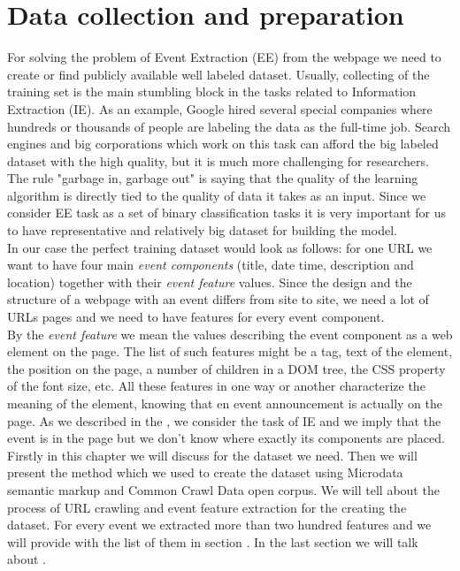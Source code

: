 \chapter{Data collection and preparation}
\label{chap:datacollect}

For solving the problem of Event Extraction (EE) from the webpage we need to create or find publicly available well labeled dataset. Usually, collecting of the training set is the main stumbling block in the tasks related to Information Extraction (IE). As an example, Google hired several special companies where hundreds or thousands of people are labeling the data as the full-time job. Search engines and big corporations which work on this task can afford the big labeled dataset with the high quality, but it is much more challenging for researchers. The rule "garbage in, garbage out" is saying that the quality of the learning algorithm is directly tied to the quality of data it takes as an input. Since we consider EE task as a set of binary classification tasks it is very important for us to have representative and relatively big dataset for building the model. \\

In our case the perfect training dataset would look as follows: for one URL we want to have four main \textit{event components} (title, date time, description and location) together with their \textit{event feature} values. Since the design and the structure of a webpage with an event differs from site to site, we need a lot of URLs pages and we need to have features for every event component. \\

By the \textit{event feature} we mean the values describing the event component as a web element on the page. The list of such features might be a tag, text of the element, the position on the page, a number of children in a DOM tree, the CSS property of the font size, etc. All these features in one way or another characterize the meaning of the element, knowing that en event announcement is actually on the page. As we described in the , we consider the task of IE and we imply that the event is in the page but we don't know where exactly its components are placed. \\

Firstly in this chapter we will discuss  for the dataset we need. Then we will present the method which we used to create the dataset using Microdata semantic markup and Common Crawl Data open corpus. We will tell about the process of URL crawling and event feature extraction for the creating the dataset. For every event we extracted more than two hundred features and we will provide with the list of them in section . In the last section we will talk about .


